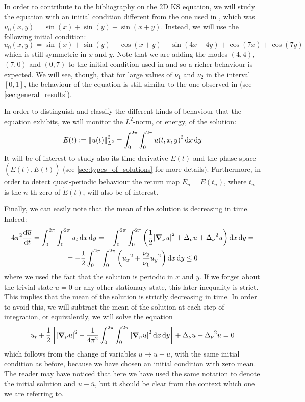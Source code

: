 \documentclass[twoside]{article}
\begin{document}
In order to contribute to the bibliography on the 2D KS equation, we will study the equation with an initial condition different from the one used in \cite{Kalogirou2015}, which was $u_0(x,y) = \sin(x) + \sin(y) + \sin(x+y)$. Instead, we will use the following initial condition:
\begin{equation}\label{eq:initial_condition}
  u_0(x,y) = \sin(x) + \sin(y) + \cos(x+y) + \sin(4x+4y) + \cos(7x) + \cos(7y)
\end{equation}
which is still symmetric in $x$ and $y$. Note that we are adding the modes $(4,4)$, $(7,0)$ and $(0,7)$ to the initial condition used in \cite{Kalogirou2015} and so a richer behaviour is expected. We will see, though, that for large values of $\nu_1$ and $\nu_2$ in the interval $[0,1]$, the behaviour of the equation is still similar to the one observed in \cite{Kalogirou2015} (see \cref{sec:general_results}).

In order to distinguish and classify the different kinds of behaviour that the equation exhibits, we will monitor the $L^2$-norm, or energy, of the solution:
\begin{equation}
  E(t):=\left\|u(t)\right\|_{L^2}^2 = \int_0^{2\pi} \int_0^{2\pi} {u(t,x,y)}^2 \dd{x} \dd{y}
\end{equation}
It will be of interest to study also its time derivative $\dot{E}(t)$ and the phase space $(E(t), \dot{E}(t))$ (see \cref{sec:types_of_solutions} for more details). Furthermore, in order to detect quasi-periodic behaviour the return map $E_n=E(t_n)$, where $t_n$ is the $n$-th zero of $\dot{E}(t)$, will also be of interest.

Finally, we can easily note that the mean of the solution is decreasing in time. Indeed:
\begin{multline}
  4\pi^2\dv{\overline{u}}{t}= \int_0^{2\pi} \int_0^{2\pi} u_t \dd{x} \dd{y} = -\int_0^{2\pi} \int_0^{2\pi} \left( \frac{1}{2} \abs{\grad_\nu u}^2 + \Delta_\nu u + {\Delta_\nu}^2 u \right) \dd{x} \dd{y} =\\= -\frac{1}{2}\int_0^{2\pi} \int_0^{2\pi} \left({u_x}^2 + \frac{\nu_2}{\nu_1} {u_y}^2\right) \dd{x} \dd{y} \leq 0
\end{multline}
where we used the fact that the solution is periodic in $x$ and $y$. If we forget about the trivial state $u=0$ or any other stationary state, this later inequality is strict. This implies that the mean of the solution is strictly decreasing in time. In order to avoid this, we will subtract the mean of the solution at each step of integration, or equivalently, we will solve the equation
\begin{equation}
  u_t + \frac{1}{2} \left[\abs{\grad_\nu u}^2 - \frac{1}{4\pi^2}\int_0^{2\pi} \int_0^{2\pi} \abs{\grad_\nu u}^2 \dd{x} \dd{y} \right] + \Delta_\nu u + {\Delta_\nu}^2 u = 0
\end{equation}
which follows from the change of variables $u \mapsto u - \overline{u}$, with the same initial condition as before, because we have chosen an initial condition with zero mean. The reader may have noticed that here we have used the same notation to denote the initial solution and $u-\overline{u}$, but it should be clear from the context which one we are referring to.
\end{document}
